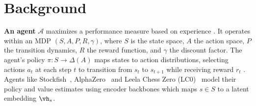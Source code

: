 \documentclass{article}
\theoremstyle{plain}
\theoremstyle{definition}
\theoremstyle{remark}
\begin{document}
\section{Background}
\vspace{-2mm}
\textbf{An agent} \(\mathcal{A}\) maximizes a performance measure based on experience \cite{russell1995artificial}. It operates within an MDP \((S, A, P, R, \gamma)\), where \(S\) is the state space, \(A\) the action space, \(P\) the transition dynamics, \(R\) the reward function, and \(\gamma\) the discount factor. The agent's policy \(\pi: S \rightarrow \Delta(A)\) maps states to action distributions, selecting actions \(a_t\) at each step \(t\) to transition from \(s_t\) to \(s_{t+1}\) while receiving reward \(r_t\) \cite{puterman2014markov,sutton1999reinforcement}. Agents like Stockfish~\cite{maharaj2022chess}, AlphaZero~\cite{silver2017mastering} and Leela Chess Zero (LC0)~\cite{monroe2024mastering} model their policy and value estimates using encoder backbones \cite{nasu2018efficiently} which maps \(s\in S\) to a latent embedding \(\vh_{s}\).

\end{document}
